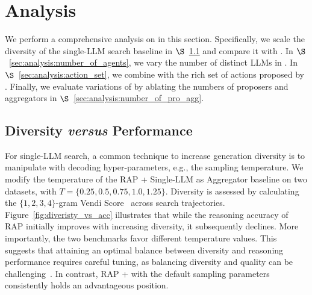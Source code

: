 


% 



\section{Analysis}
\label{sec:exp:analysis}

We perform a comprehensive analysis on \mosa{} in this section. 
Specifically, we scale the diversity of the single-LLM search baseline in $\S$~\ref{sec:analysis:diversity} and compare it with \mosa{}.
In $\S$~\ref{sec:analysis:number_of_agents}, we vary the number of distinct LLMs in \mosa{}.
In $\S$~\ref{sec:analysis:action_set}, we combine \mosa{} with the rich set of actions proposed by \citet{qi2024mutual}.
Finally, we evaluate variations of \mosa{} by ablating the numbers of proposers and aggregators in $\S$~\ref{sec:analysis:number_of_pro_agg}.




\subsection{Diversity \textit{versus} Performance}

\label{sec:analysis:diversity}

For single-LLM search, a common technique to increase generation diversity is to manipulate with decoding hyper-parameters, e.g., the sampling temperature. 
We modify the temperature of the RAP + Single-LLM as Aggregator baseline on two datasets, with $T=\{0.25, 0.5, 0.75, 1.0, 1.25\}$. 
Diversity is assessed by calculating the $\{1,2,3,4\}$-gram Vendi Score~\cite{friedman2023vendi} across search trajectories.
Figure~\ref{fig:diveristy_vs_acc} illustrates that while the reasoning accuracy of RAP initially improves with increasing diversity, it subsequently declines. 
More importantly, the two benchmarks favor different temperature values.
This suggests that attaining an optimal balance between diversity and reasoning performance requires careful tuning, as balancing diversity and quality can be challenging~\cite{tradeoff}.
In contrast, RAP + \mosa{} with the default sampling parameters consistently holds an advantageous position.


